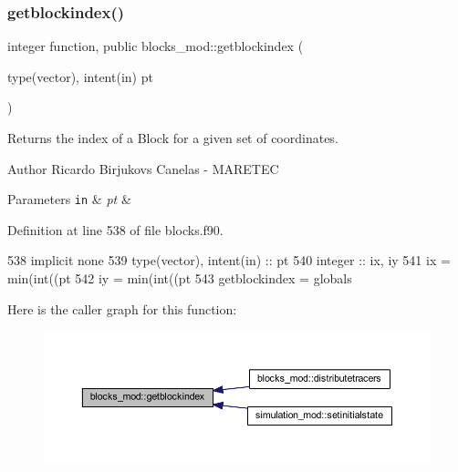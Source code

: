 \mbox{\label{namespaceblocks__mod_a62e8fb0d6b2535b4499c7a4d848c24ba}} 
\subsubsection{\texorpdfstring{getblockindex()}{getblockindex()}}
{\footnotesize\ttfamily integer function, public blocks\+\_\+mod\+::getblockindex (\begin{DoxyParamCaption}\item[{type(vector), intent(in)}]{pt }\end{DoxyParamCaption})}



Returns the index of a Block for a given set of coordinates. 

\begin{DoxyAuthor}{Author}
Ricardo Birjukovs Canelas -\/ M\+A\+R\+E\+T\+EC 
\end{DoxyAuthor}

\begin{DoxyParams}[1]{Parameters}
\mbox{\tt in}  & {\em pt} & \\
\hline
\end{DoxyParams}


Definition at line 538 of file blocks.\+f90.


\begin{DoxyCode}
538     \textcolor{keywordtype}{implicit none}
539     \textcolor{keywordtype}{type}(vector), \textcolor{keywordtype}{intent(in)} :: pt
540     \textcolor{keywordtype}{integer} :: ix, iy
541     ix = min(int((pt%
542     iy = min(int((pt%
543     getblockindex = globals%
\end{DoxyCode}
Here is the caller graph for this function\+:\nopagebreak
\begin{figure}[H]
\begin{center}
\leavevmode
\includegraphics[width=350pt]{namespaceblocks__mod_a62e8fb0d6b2535b4499c7a4d848c24ba_icgraph}
\end{center}
\end{figure}
\mbox{\label{namespaceblocks__mod_a2fdac72f343c10f38d1acb3f5779de18}} 
